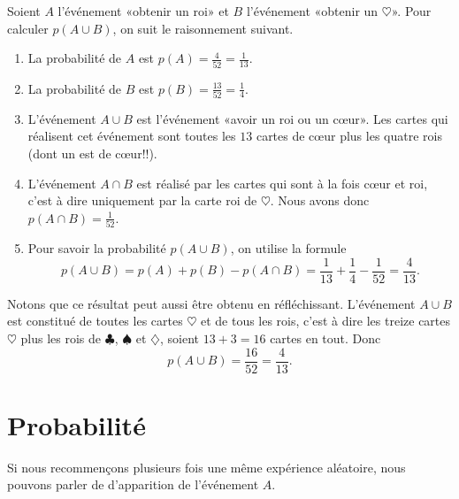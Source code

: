 \begin{example}
    Soient \( A\) l'événement «obtenir un roi» et \( B\) l'événement «obtenir un \( \heartsuit\)». Pour calculer \( p(A\cup B)\), on suit le raisonnement suivant.
    \begin{enumerate}
        \item
            La probabilité de \( A\) est \( p(A)=\frac{ 4 }{ 52 }=\frac{1}{ 13 }\). 
        \item
            La probabilité de \( B\) est \( p(B)=\frac{ 13 }{ 52 }=\frac{1}{ 4 }\).
        \item
            L'événement \( A\cup B\) est l'événement «avoir un roi ou un cœur». Les cartes qui réalisent cet événement sont toutes les \( 13\) cartes de cœur plus les quatre rois (dont un est de cœur!!). 
        \item
            L'événement \( A\cap B\) est réalisé par les cartes qui sont à la fois cœur et roi, c'est à dire uniquement par la carte roi de \( \heartsuit\). Nous avons donc \( p(A\cap B)=\frac{1}{ 52 }\).
        \item
            Pour savoir la probabilité \( p(A\cup B)\), on utilise la formule
            \begin{equation}
                p(A\cup B)=p(A)+p(B)-p(A\cap B)=\frac{1}{ 13 }+\frac{1}{ 4 }-\frac{1}{ 52 }=\frac{ 4 }{ 13 }.
            \end{equation}
    \end{enumerate}
    Notons que ce résultat peut aussi être obtenu en réfléchissant. L'événement \( A\cup B\) est constitué de toutes les cartes \( \heartsuit\) et de tous les rois, c'est à dire les treize cartes \( \heartsuit\) plus les rois de \( \clubsuit\), \( \spadesuit\) et \( \diamondsuit\), soient \( 13+3=16\) cartes en tout. Donc
    \begin{equation}
        p(A\cup B)=\frac{ 16 }{ 52 }=\frac{ 4 }{ 13 }.
    \end{equation}
\end{example}

\section{Probabilité}

Si nous recommençons plusieurs fois une même expérience aléatoire, nous pouvons parler de  d'apparition de l'événement \( A\).


